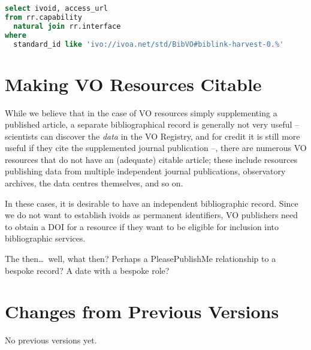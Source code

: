 \documentclass[11pt,a4paper]{ivoa}
\begin{document}
\begin{lstlisting}[language=SQL]
select ivoid, access_url
from rr.capability
  natural join rr.interface
where
  standard_id like 'ivo://ivoa.net/std/BibVO#biblink-harvest-0.%'
\end{lstlisting}

\section{Making VO Resources Citable}

While we believe that in the case of VO resources simply supplementing a
published article, a separate bibliographical record is generally not
very useful -- scientists can discover the \emph{data} in the VO
Registry, and for credit it is still more useful if they cite the
supplemented journal publication --, there are numerous VO resources
that do not have an (adequate) citable article; these include resources
publishing data from multiple independent journal publications,
observatory archives, the data centres themselves, and so on.

In these cases, it is desirable to have an independent bibliographic
record.  Since we do not want to establish ivoids as permanent
identifiers, VO publishers need to obtain a DOI for a resource if they
want to be eligible for inclusion into bibliographic services.

The then\dots~well, what then?  Perhaps a PleasePublishMe relationship
to a bespoke record?  A date with a bespoke role?

\appendix
\section{Changes from Previous Versions}

No previous versions yet.



\end{document}
